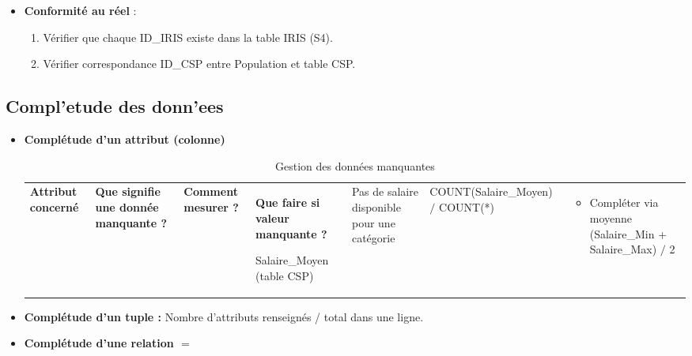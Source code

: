 \begin{itemize}
\item \textbf{Conformité au réel} :
\begin{enumerate}
\item Vérifier que chaque ID_IRIS existe dans la table IRIS (S4).
\item Vérifier correspondance ID_CSP entre Population et table CSP.
\end{enumerate}
\end{itemize}
\subsection{Compl'etude des donn'ees}
\begin{itemize}
\item \textbf{Complétude d'un attribut (colonne)} %
\begin{table}[H]
\centering
\begin{tabular}{|p{2.5cm}|p{3cm}|p{5.5cm}|p{4cm}|}
\hline
\textbf{Attribut concerné} & \textbf{Que signifie une donnée manquante ?} & \textbf{Comment mesurer ?} & \textbf{Que faire si valeur manquante ?} \

\hline

Salaire_Moyen (table CSP) &
Pas de salaire disponible pour une catégorie &
COUNT(Salaire_Moyen) $/$ COUNT(*) &
\begin{itemize}
\item Compléter via moyenne (Salaire_Min + Salaire_Max) $/$ 2
\end{itemize} \

\hline
\end{tabular}
\caption{Gestion des données manquantes}
\end{table}
\item \textbf{Complétude d'un tuple :} Nombre d'attributs renseignés / total dans une ligne.
\item \textbf{Complétude d'une relation} $$
 = 


\end{itemize}
